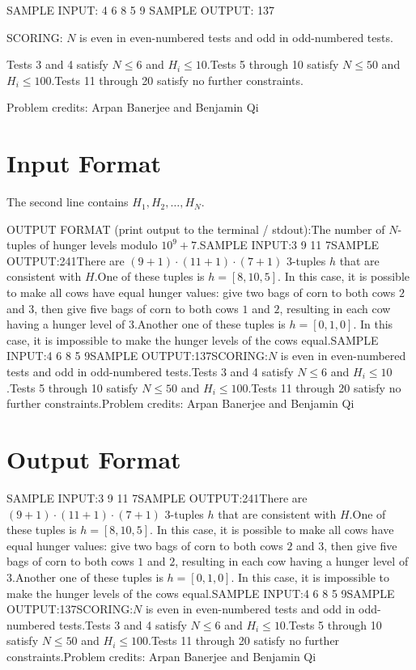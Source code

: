 \documentclass[12pt]{article}
\begin{document}
SAMPLE INPUT:
4
6 8 5 9
SAMPLE OUTPUT: 
137

SCORING:
$N$ is even in even-numbered tests and odd in odd-numbered tests.

Tests 3 and 4 satisfy $N\le 6$ and $H_i \le 10$.Tests 5 through 10
satisfy $N\le 50$ and $H_i \le 100$.Tests 11 through 20 satisfy no
further constraints.


Problem credits: Arpan Banerjee and Benjamin Qi



\section*{Input Format}
The second line contains $H_1,H_2,\ldots,H_N$.

OUTPUT FORMAT (print output to the terminal / stdout):The number of $N$-tuples of hunger levels modulo $10^9+7$.SAMPLE INPUT:3
9 11 7SAMPLE OUTPUT:241There are $(9+1)\cdot (11+1)\cdot (7+1)$ $3$-tuples $h$ that are consistent with
$H$.One of these tuples is $h=[8,10,5]$. In this case, it is possible to make all
cows have equal hunger values: give two bags of corn to both cows $2$ and $3$,
then  give five bags of corn to both cows $1$ and $2$, resulting in each cow
having  a hunger level of $3$.Another one of these tuples is $h=[0,1,0]$. In this case, it is impossible to 
make the hunger levels of the cows equal.SAMPLE INPUT:4
6 8 5 9SAMPLE OUTPUT:137SCORING:$N$ is even in even-numbered tests and odd in odd-numbered tests.Tests 3 and 4 satisfy $N\le 6$ and $H_i \le 10$.Tests 5 through 10
satisfy $N\le 50$ and $H_i \le 100$.Tests 11 through 20 satisfy no
further constraints.Problem credits: Arpan Banerjee and Benjamin Qi

\section*{Output Format}
SAMPLE INPUT:3
9 11 7SAMPLE OUTPUT:241There are $(9+1)\cdot (11+1)\cdot (7+1)$ $3$-tuples $h$ that are consistent with
$H$.One of these tuples is $h=[8,10,5]$. In this case, it is possible to make all
cows have equal hunger values: give two bags of corn to both cows $2$ and $3$,
then  give five bags of corn to both cows $1$ and $2$, resulting in each cow
having  a hunger level of $3$.Another one of these tuples is $h=[0,1,0]$. In this case, it is impossible to 
make the hunger levels of the cows equal.SAMPLE INPUT:4
6 8 5 9SAMPLE OUTPUT:137SCORING:$N$ is even in even-numbered tests and odd in odd-numbered tests.Tests 3 and 4 satisfy $N\le 6$ and $H_i \le 10$.Tests 5 through 10
satisfy $N\le 50$ and $H_i \le 100$.Tests 11 through 20 satisfy no
further constraints.Problem credits: Arpan Banerjee and Benjamin Qi
\end{document}
